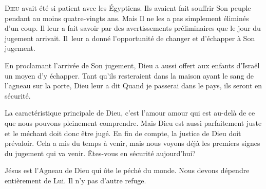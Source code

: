



\lettrine{D}{ieu} avait été si patient avec les Égyptiens.
 Ils avaient fait souffrir Son peuple pendant au moins quatre-vingts ans.
 Mais Il ne les a pas simplement éliminés d'un coup.
 Il leur a fait savoir par des avertissements préliminaires
 que le jour du jugement arrivait.
 Il~leur a donné l'opportunité de changer et d'échapper à Son jugement.

En proclamant l'arrivée de Son jugement,
 Dieu a aussi offert aux enfants d'Israël un moyen d'y échapper.
 Tant qu'ils resteraient dans la maison ayant le sang de l'agneau sur la porte,
 Dieu leur a dit\frcolon{}
 \Og Quand je passerai dans le pays, ils seront en sécurité. \Fg{}

La caractéristique principale de Dieu, c'est l'amour
 \ocadr{}amour qui est au-delà de ce que nous pouvons pleinement comprendre.
 Mais Dieu est aussi parfaitement juste et le méchant doit donc être jugé.
 En fin de compte, la justice de Dieu doit prévaloir.
 Cela a mis du temps à venir, mais nous voyons déjà les premiers signes
 du jugement qui va venir.
 Êtes-vous en sécurité aujourd'hui?


Jésus est l'Agneau de Dieu qui ôte le péché du monde.
 Nous devons dépendre entièrement de Lui. Il n'y pas d'autre refuge. 

\dvrule



